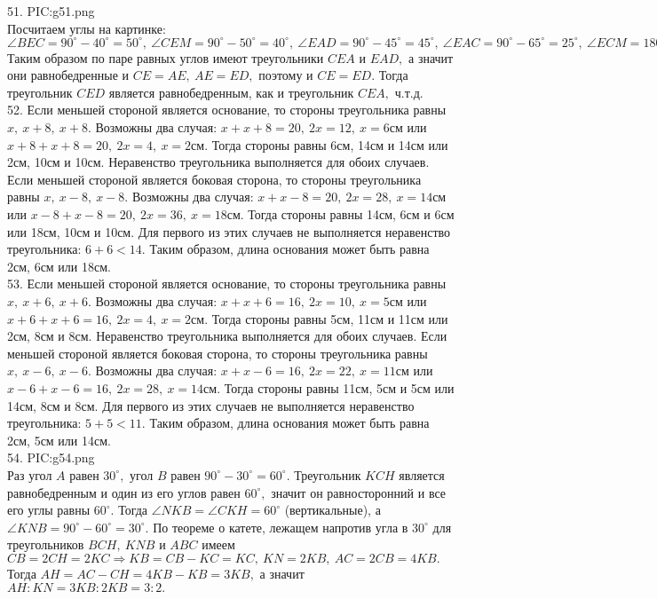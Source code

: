 51. {{PIC:g51.png}}\\
Посчитаем углы на картинке: $\angle BEC=90^\circ-40^\circ=50^\circ,\ \angle CEM=90^\circ-50^\circ=40^\circ,\ \angle EAD=90^\circ-45^\circ=45^\circ,\ \angle EAC=90^\circ-65^\circ=25^\circ,\ \angle ECM=180^\circ-90^\circ-40^\circ-25^\circ=25^\circ.$ Таким образом по паре равных углов имеют треугольники $CEA$ и $EAD,$ а значит они равнобедренные и $CE=AE,\ AE=ED,$ поэтому и $CE=ED.$ Тогда треугольник $CED$ является равнобедренным, как и треугольник $CEA,$ ч.т.д.\\
52. Если меньшей стороной является основание, то стороны треугольника равны $x,\ x+8,\ x+8.$ Возможны два случая: $x+x+8=20,\ 2x=12,\ x=6$см или $x+8+x+8=20,\ 2x=4,\ x=2$см. Тогда стороны равны 6см, 14см и 14см или 2см, 10см и 10см. Неравенство треугольника выполняется для обоих случаев. Если меньшей стороной является боковая сторона, то стороны треугольника равны $x,\ x-8,\ x-8.$ Возможны два случая: $x+x-8=20,\ 2x=28,\ x=14$см или $x-8+x-8=20,\ 2x=36,\ x=18$см. Тогда стороны равны 14см, 6см и 6см или 18см, 10см и 10см. Для первого из этих случаев не выполняется неравенство треугольника: $6+6<14.$ Таким образом, длина основания может быть равна 2см, 6см или 18см.\\
53. Если меньшей стороной является основание, то стороны треугольника равны $x,\ x+6,\ x+6.$ Возможны два случая: $x+x+6=16,\ 2x=10,\ x=5$см или $x+6+x+6=16,\ 2x=4,\ x=2$см. Тогда стороны равны 5см, 11см и 11см или 2см, 8см и 8см. Неравенство треугольника выполняется для обоих случаев. Если меньшей стороной является боковая сторона, то стороны треугольника равны $x,\ x-6,\ x-6.$ Возможны два случая: $x+x-6=16,\ 2x=22,\ x=11$см или $x-6+x-6=16,\ 2x=28,\ x=14$см. Тогда стороны равны 11см, 5см и 5см или 14см, 8см и 8см. Для первого из этих случаев не выполняется неравенство треугольника: $5+5<11.$ Таким образом, длина основания может быть равна 2см, 5см или 14см.\\
54. {{PIC:g54.png}}\\
Раз угол $A$ равен $30^\circ,$ угол $B$ равен $90^\circ-30^\circ=60^\circ.$ Треугольник $KCH$ является равнобедренным и один из его углов равен $60^\circ,$ значит он равносторонний и все его углы равны $60^\circ.$ Тогда $\angle NKB=\angle CKH=60^\circ$ (вертикальные), а $\angle KNB=90^\circ-60^\circ=30^\circ.$ По теореме о катете, лежащем напротив угла в $30^\circ$ для треугольников $BCH,\ KNB$ и $ABC$ имеем $CB=2CH=2KC\Rightarrow KB=CB-KC=KC,\ KN=2KB,\ AC=2CB=4KB.$ Тогда $AH=AC-CH=4KB-KB=3KB,$ а значит $AH:KN=3KB:2KB=3:2.$\\
